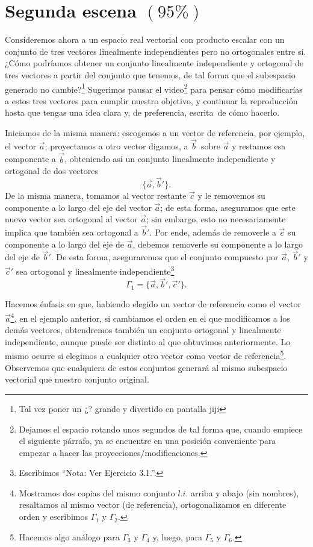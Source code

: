 \documentclass[12pt,dvipsnames]{article}
\numberwithin{equation}{section}
\begin{document}

\newpage
\section{Segunda escena $(95\%)$}

Consideremos ahora a un espacio real vectorial con producto escalar con un conjunto de tres vectores linealmente independientes pero no ortogonales entre sí. ¿Cómo podríamos obtener un conjunto linealmente independiente y ortogonal de tres vectores a partir del conjunto que tenemos, de tal forma que el subespacio generado no cambie?\footnote{Tal vez poner un ¿? grande y divertido en pantalla jiji} Sugerimos pausar el video\footnote{Dejamos el espacio rotando unos segundos de tal forma que, cuando empiece el siguiente párrafo, ya se encuentre en una posición conveniente para empezar a hacer las proyecciones/modificaciones.} para pensar cómo modificarías a estos tres vectores para cumplir nuestro objetivo, y continuar la reproducción hasta que tengas una idea clara \textemdash y, de preferencia, escrita\textemdash \ de cómo hacerlo.

Iniciamos de la misma manera: escogemos a un vector de referencia, por ejemplo, el vector $\vec{a}$; proyectamos a otro vector \textemdash digamos, a $\vec{b}$\textemdash \ sobre $\vec{a}$ y restamos esa componente a $\vec{b}$, obteniendo así un conjunto linealmente independiente y ortogonal de dos vectores\[
\{\vec{a},\vec{b}'\}.
\] De la misma manera, tomamos al vector restante $\vec{c}$ y le removemos su componente a lo largo del eje del vector $\vec{a}$; de esta forma, aseguramos que este nuevo vector sea ortogonal al vector $\vec{a}$; sin embargo, esto no necesariamente implica que también sea ortogonal a $\vec{b}'$. Por ende, además de removerle a $\vec{c}$ su componente a lo largo del eje de $\vec{a}$, debemos removerle su componente a lo largo del eje de $\vec{b}'$. De esta forma, aseguraremos que el conjunto compuesto por $\vec{a}$, $\vec{b}'$ y $\vec{c}'$ sea ortogonal y linealmente independiente\footnote{Escribimos ``Nota: Ver Ejercicio 3.1.''.} \[
\Gamma_1 = \{\vec{a},\vec{b}',\vec{c}'\}.
\]

Hacemos énfasis en que, habiendo elegido un vector de referencia \textemdash como el vector $\vec{a}$\footnote{Mostramos dos copias del mismo conjunto $l.i.$ arriba y abajo (sin nombres), resaltamos al mismo vector (de referencia), ortogonalizamos en diferente orden y escribimos $\Gamma_1$ y $\Gamma_2$.}, en el ejemplo anterior\textemdash, si cambiamos el orden en el que modificamos a los demás vectores, obtendremos también un conjunto ortogonal y linealmente independiente, aunque puede ser distinto al que obtuvimos anteriormente. Lo mismo ocurre si elegimos a cualquier otro vector como vector de referencia\footnote{Hacemos algo análogo para $\Gamma_3$ y $\Gamma_4$ y, luego, para $\Gamma_5$ y $\Gamma_6$.}. Observemos que cualquiera de estos conjuntos generará al mismo subespacio vectorial que nuestro conjunto original.
\end{document}
